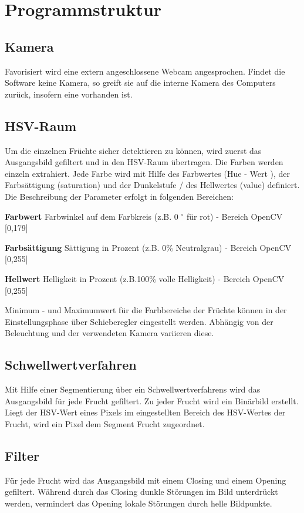 
\section{Programmstruktur}
\label{sec:Programmstruktur}

\subsection{Kamera}
Favorisiert wird eine extern angeschlossene Webcam angesprochen. Findet die Software keine Kamera, so greift sie auf die interne Kamera des Computers zurück, insofern eine vorhanden ist.

\subsection{HSV-Raum}

Um die einzelnen Früchte sicher detektieren zu können, wird zuerst das Ausgangsbild gefiltert und in den HSV-Raum übertragen. Die Farben werden einzeln extrahiert. Jede Farbe wird mit Hilfe des Farbwertes (Hue - Wert ), der Farbsättigung (saturation) und der Dunkelstufe / des Hellwertes (value) definiert. Die Beschreibung der Parameter erfolgt in folgenden Bereichen:

\textbf{Farbwert} Farbwinkel auf dem Farbkreis (z.B. 0 $^\circ$ für rot) - Bereich OpenCV [0,179]

\textbf{Farbsättigung} Sättigung in Prozent (z.B. 0\% Neutralgrau) - Bereich OpenCV [0,255]

\textbf{Hellwert} Helligkeit in Prozent (z.B.100\% volle Helligkeit) - Bereich OpenCV [0,255]

Minimum - und Maximumwert für die Farbbereiche der Früchte können in der Einstellungsphase über Schieberegler eingestellt werden. Abhängig von der Beleuchtung und der verwendeten Kamera variieren diese. 

\subsection{Schwellwertverfahren}

Mit Hilfe einer Segmentierung über ein Schwellwertverfahrens wird das Ausgangsbild für jede Frucht gefiltert. Zu jeder Frucht wird ein Binärbild erstellt. Liegt der HSV-Wert eines Pixels im eingestellten Bereich des HSV-Wertes der Frucht, wird ein Pixel dem Segment Frucht zugeordnet. 

\subsection{Filter}

Für jede Frucht wird das Ausgangsbild mit einem Closing und einem Opening gefiltert. Während durch das Closing dunkle Störungen im Bild unterdrückt werden, vermindert das Opening lokale Störungen durch helle Bildpunkte.  






 


